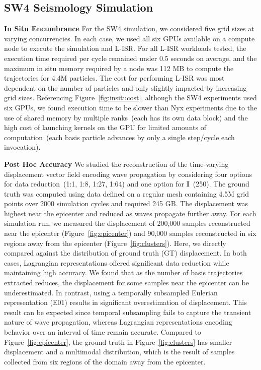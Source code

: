 \vspace{-1mm}
\subsection{SW4 Seismology Simulation}
\label{sec:sw4}
\noindent\textbf{In Situ Encumbrance}
For the SW4 simulation, we considered five grid sizes at varying concurrencies.
%
In each case, we used all six GPUs available on a compute node to execute the simulation and L-ISR.
%
For all L-ISR workloads tested, the execution time required per cycle remained under 0.5 seconds on average, and the maximum in situ memory required by a node was 112 MB to compute the trajectories for 4.4M particles.
%
The cost for performing L-ISR was most dependent on the number of particles and only slightly impacted by increasing grid sizes.
%
%
Referencing Figure~\ref{fig:insitucost}, although the SW4 experiments used six GPUs, we found execution time to be slower than Nyx experiments due to the use of shared memory by multiple ranks~(each has its own data block) and the high cost of launching kernels on the GPU for limited amounts of computation~(each basis particle advances by only a single step/cycle each invocation). 
%





\noindent\textbf{Post Hoc Accuracy}
We studied the reconstruction of the time-varying displacement vector field encoding wave propagation by considering four options for data reduction~(1:1, 1:8, 1:27, 1:64) and one option for \textbf{I}~(250).
%
The ground truth was computed using data defined on a regular mesh containing 4.5M grid points over 2000 simulation cycles and required 245 GB.
%
The displacement was highest near the epicenter and reduced as waves propagate further away.
%
For each simulation run, we measured the displacement of 200,000 samples reconstructed near the epicenter (Figure~\ref{fig:epicenter}) and 90,000 samples reconstructed in six regions away from the epicenter (Figure~\ref{fig:clusters}).
%
Here, we directly compared against the distribution of ground truth (GT) displacement.
%
In both cases, Lagrangian representations offered significant data reduction while maintaining high accuracy.
%
We found that as the number of basis trajectories extracted reduces, the displacement for some samples near the epicenter can be underestimated. 
%
In contrast, using a temporally subsampled Eulerian representation (E01) results in significant overestimation of displacement.
%
This result can be expected since temporal subsampling fails to capture the transient nature of wave propagation, whereas Lagrangian representations encoding behavior over an interval of time remain accurate.
%
Compared to Figure~\ref{fig:epicenter}, the ground truth in Figure~\ref{fig:clusters} has smaller displacement and a multimodal distribution, which is the result of samples collected from six regions of the domain away from the epicenter. 
%

